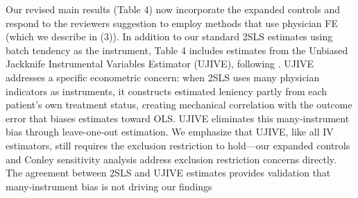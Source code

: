 \documentclass[11pt]{article}
\newcommand{\1}{\hbox{\rm 1\kern-.35em 1}}
\begin{document}
Our revised main results (Table 4) now incorporate the expanded controls and respond to the reviewers suggestion to employ methods that use physician FE (which we describe in (3)). In addition to our standard 2SLS estimates using batch tendency as the instrument, Table 4 includes estimates from the Unbiased Jackknife Instrumental Variables Estimator (UJIVE), following \cite{goldsmithpinkham2025leniencydesignsoperatorsmanual}. UJIVE addresses a specific econometric concern: when 2SLS uses many physician indicators as instruments, it constructs estimated leniency partly from each patient's own treatment status, creating mechanical correlation with the outcome error that biases estimates toward OLS. UJIVE eliminates this many-instrument bias through leave-one-out estimation. We emphasize that UJIVE, like all IV estimators, still requires the exclusion restriction to hold—our expanded controls and Conley sensitivity analysis address exclusion restriction concerns directly. The agreement between 2SLS and UJIVE estimates provides validation that many-instrument bias is not driving our findings
\end{document}

